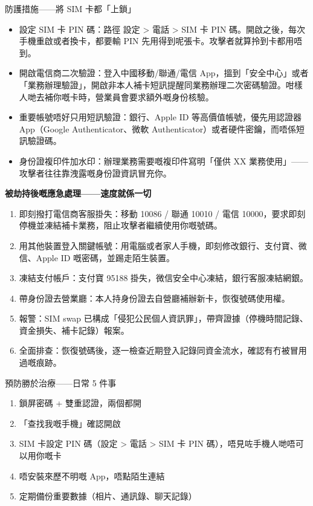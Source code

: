 \begin{tcbwarn}{防護措施——將 SIM 卡都「上鎖」}
\begin{itemize}
  \item 設定 SIM 卡 PIN 碼：路徑 設定 > 電話 > SIM 卡 PIN 碼。開啟之後，每次手機重啟或者換卡，都要輸 PIN 先用得到呢張卡。攻擊者就算拎到卡都用唔到。
  \item 開啟電信商二次驗證：登入中國移動/聯通/電信 App，搵到「安全中心」或者「業務辦理驗證」，開啟非本人補卡短訊提醒同業務辦理二次密碼驗證。咁樣人哋去補你嘅卡時，營業員會要求額外嘅身份核驗。
  \item 重要帳號唔好只用短訊驗證：銀行、Apple ID 等高價值帳號，優先用認證器 App（Google Authenticator、微軟 Authenticator）或者硬件密鑰，而唔係短訊驗證碼。
  \item 身份證複印件加水印：辦理業務需要嘅複印件寫明「僅供 XX 業務使用」——攻擊者往往靠洩露嘅身份證資訊冒充你。
\end{itemize}

\end{tcbwarn}

\textbf{被劫持後嘅應急處理——速度就係一切}\par

\begin{enumerate}
  \item 即刻撥打電信商客服掛失：移動 10086 / 聯通 10010 / 電信 10000，要求即刻停機並凍結補卡業務，阻止攻擊者繼續使用你嘅號碼。
  \item 用其他裝置登入關鍵帳號：用電腦或者家人手機，即刻修改銀行、支付寶、微信、Apple ID 嘅密碼，並踢走陌生裝置。
  \item 凍結支付帳戶：支付寶 95188 掛失，微信安全中心凍結，銀行客服凍結網銀。
  \item 帶身份證去營業廳：本人持身份證去自營廳補辦新卡，恢復號碼使用權。
  \item 報警：SIM swap 已構成「侵犯公民個人資訊罪」，帶齊證據（停機時間記錄、資金損失、補卡記錄）報案。
  \item 全面排查：恢復號碼後，逐一檢查近期登入記錄同資金流水，確認有冇被冒用過嘅痕跡。
\end{enumerate}

\begin{tcbwarn}{預防勝於治療——日常 5 件事}
\begin{enumerate}
  \item 鎖屏密碼 + 雙重認證，兩個都開
  \item 「查找我嘅手機」確認開啟
  \item SIM 卡設定 PIN 碼（設定 > 電話 > SIM 卡 PIN 碼），唔見咗手機人哋唔可以用你嘅卡
  \item 唔安裝來歷不明嘅 App，唔點陌生連結
  \item 定期備份重要數據（相片、通訊錄、聊天記錄）
\end{enumerate}

\end{tcbwarn}

